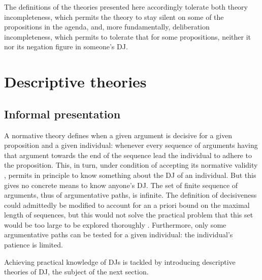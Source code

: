 \documentclass[version=last, pagesize, twoside=off, bibliography=totoc, DIV=calc, fontsize=12pt, a4paper, french, english]{scrartcl}
\begin{document}
The definitions of the theories presented here accordingly tolerate both theory incompleteness, which permits the theory to stay silent on some of the propositions in the agenda, and, more fundamentally, deliberation incompleteness, which permits to tolerate that for some propositions, neither it nor its negation figure in someone’s \ac{DJ}. 


\section{Descriptive theories}
\label{sec:descriptive}
\subsection{Informal presentation}
A normative theory defines when a given argument is decisive for a given proposition and a given individual: whenever every sequence of arguments having that argument towards the end of the sequence lead the individual to adhere to the proposition. This, in turn, under condition of accepting its normative validity , permits in principle to know something about the \ac{DJ} of an individual. But this gives no concrete means to know anyone’s \ac{DJ}. The set of finite sequence of arguments, thus of argumentative paths, is infinite. The definition of decisiveness could admittedly be modified to account for an a priori bound on the maximal length of sequences, but this would not solve the practical problem that this set would be too large to be explored thoroughly 
. 
Furthermore, only some argumentative paths can be tested for a given individual: the individual’s patience is limited. 

Achieving practical knowledge of \acp{DJ} is tackled by introducing descriptive theories of \ac{DJ}, the subject of the next section.
\end{document}
